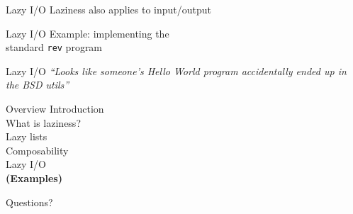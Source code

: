 \documentclass[20pt]{beamer}
\begin{document}
\begin{frame}{Lazy I/O}
    Laziness also applies to input/output
\end{frame}

\begin{frame}{Lazy I/O}
    Example: implementing the \\
    standard \texttt{rev} program
\end{frame}

\begin{frame}{Lazy I/O}
    \textit{``Looks like someone's Hello World program accidentally ended up in
    the BSD utils''}
\end{frame}


\begin{frame}{Overview}
    Introduction \\
    What is laziness? \\
    Lazy lists \\
    Composability \\
    Lazy I/O \\
    \textbf{(Examples)}
\end{frame}


\begin{frame}[plain]
    \begin{center}
    \huge{Questions?}
    \end{center}
\end{frame}
\end{document}
